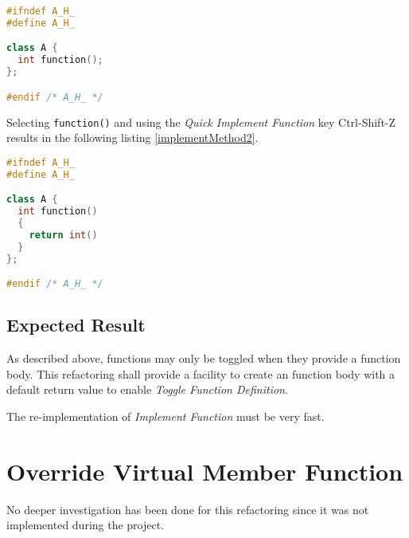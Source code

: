 \begin{lstlisting}[caption={A.h, with declaration and no definition},
label={implementMethod1}, language=C++]
#ifndef A_H_
#define A_H_

class A {
  int function();
};

#endif /* A_H_ */
\end{lstlisting}

Selecting \texttt{function()} and using the \textit{Quick Implement Function}
key Ctrl-Shift-Z results in the following listing \ref{implementMethod2}.

\begin{lstlisting}[caption={A.h, with declaration and no definition},
label={implementMethod2}, language=C++]
#ifndef A_H_
#define A_H_

class A {
  int function()
  {
    return int()
  }
};

#endif /* A_H_ */
\end{lstlisting}

\subsection{Expected Result}
As described above, functions may only be toggled when they provide a function 
body. This refactoring shall provide a facility to create an function body with
a default return value to enable \textit{Toggle Function Definition}.

The re-implementation of \textit{Implement Function} must be very fast. 

\section{Override Virtual Member Function}

No deeper investigation has been done for this refactoring since it was not 
implemented during the project.
